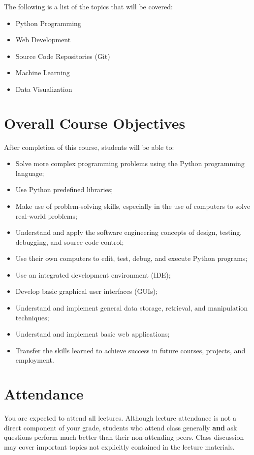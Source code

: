 \documentclass[letter,10pt]{article}
\begin{document}
The following is a list of the topics that will be covered:
\begin{itemize}
\item Python Programming
\item Web Development
\item Source Code Repositories (Git)
\item Machine Learning
\item Data Visualization
\end{itemize}

\section*{Overall Course Objectives}
\paragraph{}After completion of this course, students will be able to:
\begin{itemize}
    \item Solve more complex programming problems using the Python programming language;
    \item Use Python predefined libraries;
    \item Make use of problem-solving skills, especially in the use of computers to solve real-world problems;
    \item Understand and apply the software engineering concepts of design, testing, debugging, and source code control;
    \item Use their own computers to edit, test, debug, and execute Python programs;
    \item Use an integrated development environment (IDE);
    \item Develop basic graphical user interfaces (GUIs);
    \item Understand and implement general data storage, retrieval, and manipulation techniques;
    \item Understand and implement basic web applications;
    \item Transfer the skills learned to achieve success in future courses, projects, and employment.
\end{itemize}

\section*{Attendance}
\paragraph{}You are expected to attend all lectures. Although lecture attendance is not a direct component of your grade, students who attend class generally \textbf{and} ask questions perform much better than their non-attending peers. Class discussion may cover important topics not explicitly contained in the lecture materials.
\end{document}
